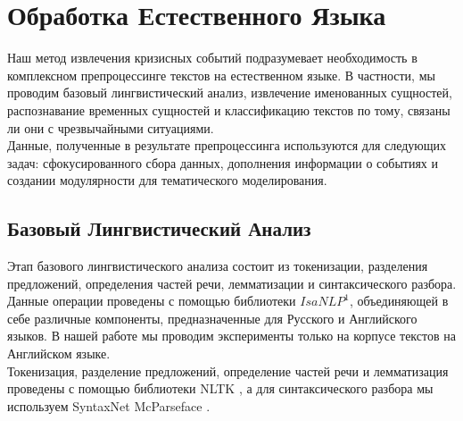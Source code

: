 \documentclass[unicode, 12pt, a4paper,oneside]{article}
\begin{document}
	\section{Обработка Естественного Языка}

	Наш метод извлечения кризисных событий подразумевает необходимость в комплексном препроцессинге текстов на естественном языке. В частности, мы проводим базовый лингвистический анализ, извлечение именованных сущностей, распознавание временных сущностей и классификацию текстов по тому, связаны ли они с чрезвычайными ситуациями.\\
	Данные, полученные в результате препроцессинга используются для следующих задач: сфокусированного сбора данных, дополнения информации о событиях и создании модулярности для тематического моделирования.

	\subsection{Базовый Лингвистический Анализ}
	Этап базового лингвистического анализа состоит из токенизации, разделения предложений, определения частей речи, лемматизации и синтаксического разбора. Данные операции проведены с помощью библиотеки $IsaNLP^1$, объединяющей в себе различные компоненты, предназначенные для Русского и Английского языков. В нашей работе мы проводим эксперименты только на корпусе текстов на Английском языке.\\
	Токенизация, разделение предложений, определение частей речи и лемматизация проведены с помощью библиотеки NLTK \cite{nltk}, а для синтаксического разбора мы используем SyntaxNet McParseface \cite{syntaxnet}.
\end{document}
